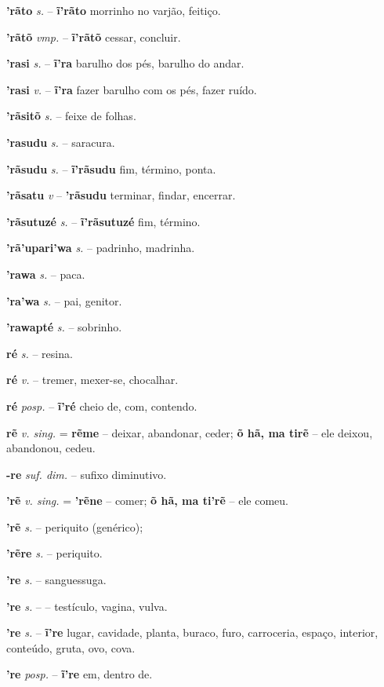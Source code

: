 \textbf{'rãto} \textit{s.} -- \textbf{ĩ'rãto} morrinho no varjão, feitiço.

\textbf{'rãtõ} \textit{vmp.} -- \textbf{ĩ'rãtõ} cessar, concluir.

\textbf{'rasi} \textit{s.} -- \textbf{ĩ'ra} barulho dos pés, barulho do andar.

\textbf{'rasi} \textit{v.} -- \textbf{ĩ'ra} fazer barulho com os pés, fazer ruído.

\textbf{'rãsitõ} \textit{s.} -- feixe de folhas.

\textbf{'rasudu} \textit{s.} -- saracura.

\textbf{'rãsudu} \textit{s.} -- \textbf{ĩ'rãsudu} fim, término, ponta.

\textbf{'rãsatu} \textit{v} -- \textbf{'rãsudu} terminar, findar, encerrar.

\textbf{'rãsutuzé} \textit{s.} -- \textbf{ĩ'rãsutuzé} fim, término.

\textbf{'rã'upari'wa} \textit{s.} -- padrinho, madrinha.

\textbf{'rawa} \textit{s.} -- paca.

\textbf{'ra'wa} \textit{s.} -- pai, genitor.

\textbf{'rawapté} \textit{s.} -- sobrinho.

\textbf{ré} \textit{s.} -- resina.

\textbf{ré} \textit{v.} -- tremer, mexer-se, chocalhar.

\textbf{ré} \textit{posp.} -- \textbf{ĩ'ré} cheio de, com, contendo.

\textbf{rẽ} \textit{v. sing.} = \textbf{rẽme} -- deixar, abandonar, ceder; \textbf{õ hã, ma tirẽ} -- ele deixou, abandonou, cedeu.

\textbf{-re} \textit{suf. dim.} -- sufixo diminutivo.

\textbf{'rẽ} \textit{v. sing.} = \textbf{'rẽne} -- comer; \textbf{õ hã, ma ti'rẽ} -- ele comeu.

\textbf{'rẽ} \textit{s.} -- periquito (genérico); 

\textbf{'rẽre} \textit{s.} -- periquito.

\textbf{'re} \textit{s.} -- sanguessuga.

\textbf{'re} \textit{s.} -- -- testículo, vagina, vulva.

\textbf{'re} \textit{s.} -- \textbf{ĩ're} lugar, cavidade, planta, buraco, furo, carroceria, espaço, interior, conteúdo, gruta, ovo, cova.

\textbf{'re} \textit{ posp.} -- \textbf{ĩ're} em, dentro de.

